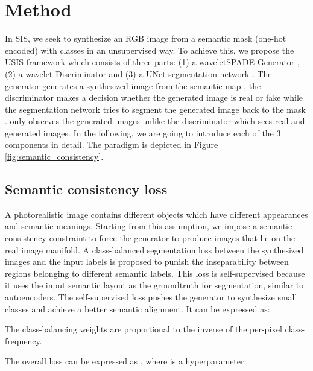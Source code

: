 \documentclass{article}
\begin{document}
\section{Method}
\label{sec:method}
In SIS, we seek to synthesize an RGB image  from a semantic mask  (one-hot encoded) with  classes in an unsupervised way. To achieve this, we propose the USIS framework which consists of three parts: (1) a waveletSPADE Generator , (2) a wavelet Discriminator  and (3) a UNet segmentation network . The generator generates a synthesized image  from the semantic map , the discriminator makes a decision whether the generated image is real or fake while the segmentation network tries to segment the generated image back to the mask .  only observes the generated images unlike the discriminator which sees real and generated images. In the following, we are going to introduce each of the 3 components in detail. The paradigm is depicted in Figure \ref{fig:semantic_consistency}.
\vspace{-2em}
\subsection{Semantic consistency loss}

A photorealistic image contains different objects which have different appearances and semantic meanings. Starting from this assumption, we impose a semantic consistency constraint to force the generator to produce images that lie on the real image manifold. A class-balanced segmentation loss  between the synthesized images and the input labels is proposed to punish the inseparability between regions belonging to different semantic labels. This loss is self-supervised because it uses the input semantic layout as the groundtruth for segmentation, similar to autoencoders. The self-supervised loss pushes the generator to synthesize small classes and achieve a better semantic alignment. It can be expressed as: 

The class-balancing weights  are proportional to the inverse of the per-pixel class-frequency.
\begin{ceqn}
    
\end{ceqn}
The overall loss can be expressed as , where  is a hyperparameter.
\vspace{-1em}
\end{document}
